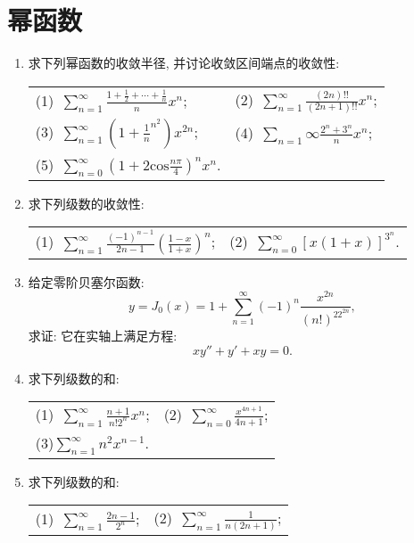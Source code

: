 \section{幂函数}
\begin{enumerate}
	\item 求下列幂函数的收敛半径, 并讨论收敛区间端点的收敛性:
	\begin{table}[H]
		\begin{tabular}{ll}
			(1)\ $\sum\limits_{n=1}^{\infty}\frac{1+\frac{1}{2}+\cdots+\frac{1}{n}}{n}x^n$;\qquad \qquad \qquad \qquad \qquad &(2)\ $\sum\limits_{n=1}^{\infty}\frac{(2n)!!}{(2n+1)!!}x^n$;\\
			(3)\ $\sum\limits_{n=1}^{\infty}(1+\frac{1}{n}^{n^2})x^{2n}$;\qquad \qquad \qquad \qquad \qquad&(4)\ $\sum\limits_{n=1}{\infty}\frac{2^n+3^n}{n}x^n$;\\
			(5)\ $\sum\limits_{n=0}^{\infty}(1+2\mathrm{cos}\frac{n\pi}{4})^nx^n$.
		\end{tabular}
	\end{table}
\item 求下列级数的收敛性:
\begin{table}[H]
	\begin{tabular}{ll}
		(1)\ $\sum\limits_{n=1}^{\infty}\frac{(-1)^{n-1}}{2n-1}(\frac{1-x}{1+x})^n$;\qquad \qquad \qquad \qquad \qquad &(2)\ $\sum\limits_{n=0}^{\infty}[x(1+x)]^{3^n}$.
	\end{tabular}
\end{table}
\item 给定零阶贝塞尔函数:
$$ y = J_0(x) = 1+\sum\limits_{n=1}^{\infty}(-1)^n\frac{x^{2n}}{(n!)^22^{2n}},$$
求证: 它在实轴上满足方程:$$
xy''+y'+xy=0.$$
\item 求下列级数的和:
\begin{table}[H]
	\begin{tabular}{ll}
	(1)\ $\sum\limits_{n=1}^{\infty}\frac{n+1}{n!2^n}x^n$;\qquad \qquad \qquad \qquad \qquad &(2)\ $\sum\limits_{n=0}^{\infty}\frac{x^{4n+1}}{4n+1}$;\\
	(3)$\sum\limits_{n=1}^{\infty}n^2x^{n-1}$.
	\end{tabular}
\end{table}
\item 求下列级数的和:
	\begin{table}[H]
		\begin{tabular}{ll}
			(1)\ $\sum\limits_{n=1}^{\infty}\frac{2n-1}{2^n}$;\qquad \qquad \qquad \qquad \qquad &(2)\ $\sum\limits_{n=1}^{\infty}\frac{1}{n(2n+1)}$;\\

\end{tabular}
\end{table}
\end{enumerate}
